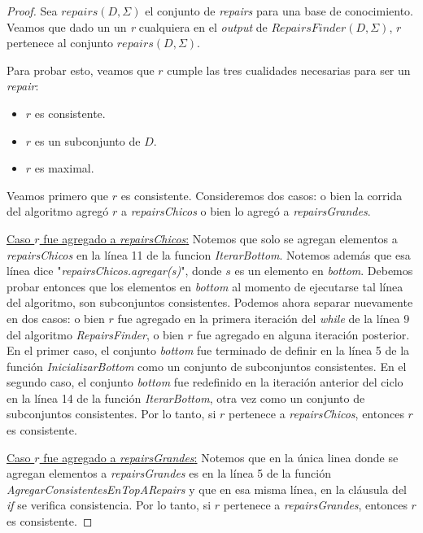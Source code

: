 \documentclass[11pt,a4paper,twoside]{tesis}
\begin{document}
\begin{proof}
Sea $repairs(D, \Sigma)$ el conjunto de \textit{repairs} para una base de conocimiento. Veamos que dado un un \textit{r} cualquiera en el \textit{output} de $RepairsFinder(D, \Sigma)$, $r$ pertenece al conjunto $repairs(D, \Sigma)$.

Para probar esto, veamos que $r$ cumple las tres cualidades necesarias para ser un \textit{repair}:

\begin{itemize}
    \item $r$ es consistente.
    \item $r$ es un subconjunto de $D$.
    \item $r$ es maximal. 
\end{itemize}

Veamos primero que $r$ es consistente. Consideremos dos casos: o bien la corrida del algoritmo agregó $r$ a \textit{repairsChicos} o bien lo agregó a \textit{repairsGrandes}.


\underline{Caso $r$ fue agregado a \textit{repairsChicos}:} Notemos que solo se agregan elementos a \textit{repairsChicos} en la línea 11 de la funcion \textit{IterarBottom}. Notemos además que esa línea dice "\textit{repairsChicos.agregar(s)}", donde $s$ es un elemento en \textit{bottom}. Debemos probar entonces que los elementos en \textit{bottom} al momento de ejecutarse tal línea del algoritmo, son subconjuntos consistentes. Podemos ahora separar nuevamente en dos casos: o bien $r$ fue agregado en la primera iteración del \textit{while} de la línea 9 del algoritmo \textit{RepairsFinder}, o bien $r$ fue agregado en alguna iteración posterior. En el primer caso, el conjunto \textit{bottom} fue terminado de definir en la línea 5 de la función \textit{InicializarBottom} como un conjunto de subconjuntos consistentes. En el segundo caso, el conjunto \textit{bottom} fue redefinido en la iteración anterior del ciclo en la línea 14 de la función \textit{IterarBottom}, otra vez como un conjunto de subconjuntos consistentes. Por lo tanto, si $r$ pertenece a \textit{repairsChicos}, entonces $r$ es consistente.

\underline{Caso $r$ fue agregado a \textit{repairsGrandes}:} Notemos que en la única linea donde se agregan elementos a \textit{repairsGrandes} es en la línea 5 de la función \textit{AgregarConsistentesEnTopARepairs} y que en esa misma línea, en la cláusula del \textit{if} se verifica consistencia. Por lo tanto,  si $r$ pertenece a \textit{repairsGrandes}, entonces $r$ es consistente.


\end{proof}
\end{document}
